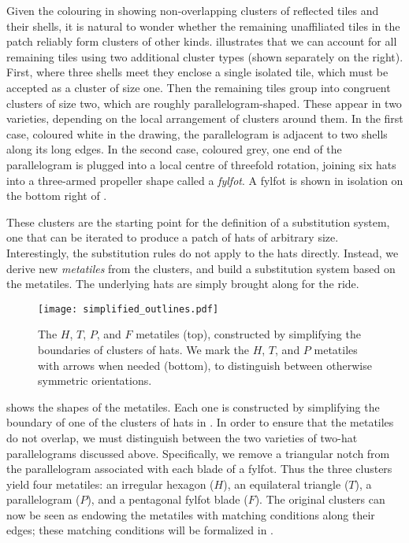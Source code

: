 Given the colouring in  showing non-overlapping
clusters of reflected tiles and their shells,
it is natural to wonder whether the remaining unaffiliated tiles in the
patch reliably 
form clusters of other kinds.   illustrates that we can
account for all remaining tiles using two additional cluster types (shown
separately on the right).  First,
where three shells meet they enclose a single isolated tile, which must be
accepted as a cluster of size one.  Then the remaining tiles group into
congruent clusters of size two, which are roughly parallelogram-shaped.
These appear in two varieties, depending on the local arrangement of
clusters around them.  In the first case, coloured white in the drawing,
the parallelogram is adjacent to
two shells along its long edges.  In the second case, coloured grey,
one end of the 
parallelogram is plugged into a local centre of threefold rotation, joining
six hats into a three-armed propeller shape called a \textit{fylfot}.
A fylfot is shown in isolation on the bottom right of .

These clusters are the starting point for the definition of a
substitution system, one that can be iterated to produce a patch
of hats of arbitrary size.  Interestingly, the substitution rules
do not apply to the hats directly.  Instead, we derive new \textit{metatiles}
from the clusters, and build a substitution system based on the
metatiles. The underlying hats are simply brought along for the
ride.

\begin{figure}[htp!]
\begin{center}
\texttt{[image: simplified\_outlines.pdf]}
\end{center}
\caption{\label{fig:simp_outlines}The $H$, $T$, $P$, and $F$ metatiles (top),
	constructed by simplifying the boundaries of clusters of hats.
	We mark the $H$, $T$, and $P$ metatiles with arrows when needed (bottom),
	to distinguish between otherwise symmetric orientations.}
\end{figure}

 shows the shapes of the metatiles.  Each
one is constructed by simplifying the boundary of one of the clusters
of hats in .  In order to ensure that the metatiles
do not overlap, we must distinguish between the two varieties of two-hat
parallelograms discussed above.  Specifically, we remove a triangular
notch from the parallelogram associated with each blade of a fylfot.  Thus
the three clusters yield four metatiles: an irregular hexagon ($H$), 
an equilateral triangle ($T$), a parallelogram ($P$), and a pentagonal
fylfot blade ($F$).
The original clusters can now
be seen as endowing the metatiles with matching conditions
along their edges; these matching conditions will be formalized in
.

